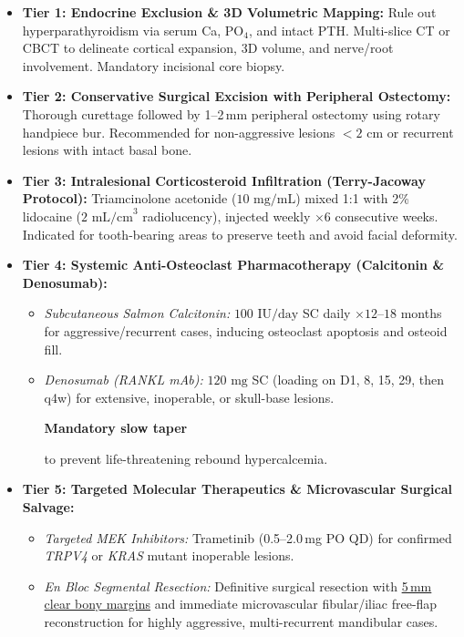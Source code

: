 \documentclass[9pt,a4paper]{article}
\newcommand{\hlr}[1]{\colorbox{hlred}{\strut\color{darkred}#1}}
\begin{document}
\begin{itemize}
    \item \textbf{Tier 1: Endocrine Exclusion \& 3D Volumetric Mapping:} Rule out hyperparathyroidism via serum Ca, $\text{PO}_4$, and intact PTH. Multi-slice CT or CBCT to delineate cortical expansion, 3D volume, and nerve/root involvement. Mandatory incisional core biopsy.
    \item \textbf{Tier 2: Conservative Surgical Excision with Peripheral Ostectomy:} Thorough curettage followed by 1--2\,mm peripheral ostectomy using rotary handpiece bur. Recommended for non-aggressive lesions $<2\text{ cm}$ or recurrent lesions with intact basal bone.
    \item \textbf{Tier 3: Intralesional Corticosteroid Infiltration (Terry-Jacoway Protocol):} Triamcinolone acetonide ($10\text{ mg/mL}$) mixed 1:1 with 2\% lidocaine ($2\text{ mL/cm}^3$ radiolucency), injected weekly $\times 6$ consecutive weeks. Indicated for tooth-bearing areas to preserve teeth and avoid facial deformity.
    \item \textbf{Tier 4: Systemic Anti-Osteoclast Pharmacotherapy (Calcitonin \& Denosumab):}
    \begin{itemize}
        \item \textit{Subcutaneous Salmon Calcitonin:} $100\text{ IU/day}$ SC daily $\times 12\text{--}18$ months for aggressive/recurrent cases, inducing osteoclast apoptosis and osteoid fill.
        \item \textit{Denosumab (RANKL mAb):} $120\text{ mg}$ SC (loading on D1, 8, 15, 29, then q4w) for extensive, inoperable, or skull-base lesions. \hlr{\textbf{Mandatory slow taper}} to prevent life-threatening rebound hypercalcemia.
    \end{itemize}
    \item \textbf{Tier 5: Targeted Molecular Therapeutics \& Microvascular Surgical Salvage:}
    \begin{itemize}
        \item \textit{Targeted MEK Inhibitors:} Trametinib (0.5--2.0\,mg PO QD) for confirmed \textit{TRPV4} or \textit{KRAS} mutant inoperable lesions.
        \item \textit{En Bloc Segmental Resection:} Definitive surgical resection with \underline{5\,mm clear bony margins} and immediate microvascular fibular/iliac free-flap reconstruction for highly aggressive, multi-recurrent mandibular cases.
    \end{itemize}
\end{itemize}
\end{document}
